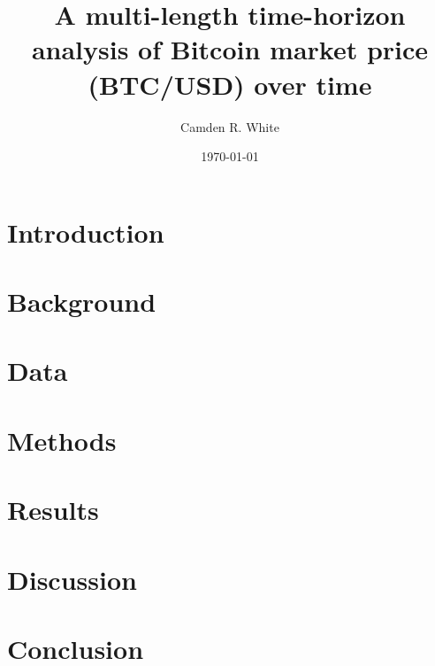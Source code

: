 \documentclass[11pt]{amsart}
\title{A multi-length time-horizon analysis of Bitcoin market price (BTC/USD) over time}
\author{Camden R. White}
\date{\today}
\begin{document}
\begin{abstract}

\end{abstract}

\maketitle

\tableofcontents

\section{Introduction}


\section{Background}


\section{Data}


\section{Methods}


\section{Results}


\section{Discussion}


\section{Conclusion}




\end{document}
